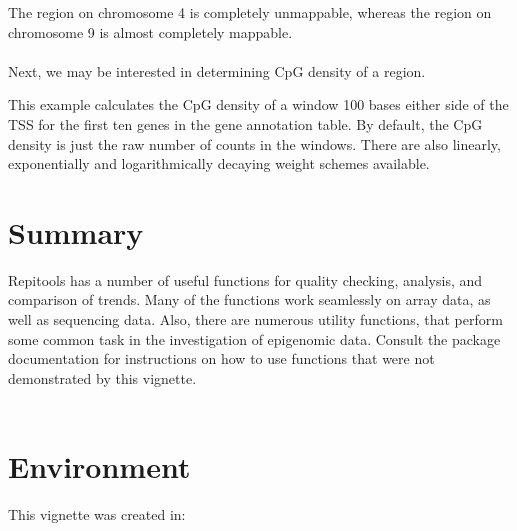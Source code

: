 \documentclass[a4paper, 12pt]{article}
\begin{document}


\noindent The region on chromosome 4 is completely unmappable, whereas the region on chromosome 9 is almost completely mappable.
\ \\ \ \\
Next, we may be interested in determining CpG density of a region.



\noindent This example calculates the CpG density of a window 100 bases either side of the TSS for the first ten genes in the gene annotation table. By default, the CpG density is just the raw number of counts in the windows. There are also linearly, exponentially and logarithmically decaying weight schemes available.

\section{Summary}
Repitools has a number of useful functions for quality checking, analysis, and comparison of trends. Many of the functions work seamlessly on array data, as well as sequencing data. Also, there are numerous utility functions, that perform some common task in the investigation of epigenomic data. Consult the package documentation for instructions on how to use functions that were not demonstrated by this vignette.
\ \\ \ \\

\section{Environment}
This vignette was created in:


\end{document}
